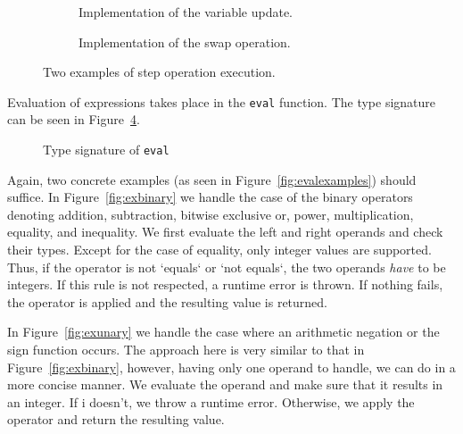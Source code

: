 \begin{figure}[h]

  \begin{subfigure}{\textwidth}
    
    \caption{Implementation of the variable update.}\label{fig:exupdate}
  \end{subfigure}

  \begin{subfigure}{\textwidth}
    
    \caption{Implementation of the swap operation.}\label{fig:exswap}
  \end{subfigure}

  \caption{Two examples of step operation execution.}\label{fig:examples}

\end{figure}

Evaluation of expressions takes place in the \texttt{eval} function. The type signature can be seen in Figure~\ref{fig:eval}.

\begin{figure}[H]
  
  \caption{Type signature of \texttt{eval}}\label{fig:eval}
\end{figure}

Again, two concrete examples (as seen in Figure~\ref{fig:evalexamples}) should suffice. In Figure~\ref{fig:exbinary} we handle the case of the binary operators denoting addition, subtraction, bitwise exclusive or, power, multiplication, equality, and inequality. We first evaluate the left and right operands and check their types. Except for the case of equality, only integer values are supported. Thus, if the operator is not `equals` or `not equals`, the two operands \textit{have} to be integers. If this rule is not respected, a runtime error is thrown. If nothing fails, the operator is applied and the resulting value is returned.

  In Figure~\ref{fig:exunary} we handle the case where an arithmetic negation or the sign function occurs. The approach here is very similar to that in Figure~\ref{fig:exbinary}, however, having only one operand to handle, we can do in a more concise manner. We evaluate the operand and make sure that it results in an integer. If i doesn't, we throw a runtime error. Otherwise, we apply the operator and return the resulting value.

